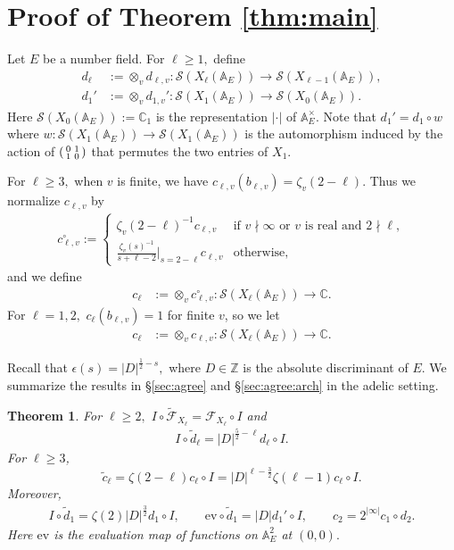 \documentclass[11pt,a4paper,reqno]{amsart}
\newtheorem{thm}{Theorem}[section]
\theoremstyle{remark}
\numberwithin{equation}{section}
\newcommand{\A}{\mathbb{A}}
\newcommand{\ZZ}{\mathbb{Z}}
\newcommand{\CC}{\mathbb{C}}
\theoremstyle{definition}
\numberwithin{equation}{section}
\newenvironment{psmatrix}
  {\left(\begin{smallmatrix}}
  {\end{smallmatrix}\right)}
\begin{document}
\section{Proof of Theorem \ref{thm:main}}\label{sec:mainproof}

Let $E$ be a number field. For $\ell\ge 1,$ define
\begin{align*}
    d_\ell&:=\otimes_{v} d_{\ell,v}:\mathcal{S}(X_\ell(\A_E))\longrightarrow \mathcal{S}(X_{\ell-1}(\A_E)),\\
    d_1'&:=\otimes_{v} d_{1,v}':\mathcal{S}(X_1(\A_E))\longrightarrow \mathcal{S}(X_{0}(\A_E)).
\end{align*}
Here $\mathcal{S}(X_0(\A_E)):=\CC_{1}$ is the representation $|\cdot|$ of $\A_E^\times.$ Note that $d_1'=d_1\circ w$
where $w:\mathcal{S}(X_1(\A_E))\longrightarrow\mathcal{S}(X_1(\A_E))$ is the automorphism induced by the action of $\begin{psmatrix}
    0 & 1\\
     1 & 0
\end{psmatrix}$ that permutes the two entries of $X_1$.


For $\ell\ge 3,$ when $v$ is finite, we have $c_{\ell,v}(b_{\ell,v})=\zeta_v(2-\ell).$ Thus we normalize $c_{\ell,v}$ by
\begin{align*}
    c_{\ell,v}^\circ:=\begin{cases}
        \zeta_v(2-\ell)^{-1}c_{\ell,v} & \textrm{if } v\nmid\infty \textrm{ or } v \textrm{ is real and } 2\nmid\ell,  \\
        \frac{\zeta_v(s)^{-1}}{s+\ell-2}\bigg|_{s=2-\ell} c_{\ell,v} & \textrm{otherwise,}
    \end{cases}
\end{align*}
and we define
\begin{align*}
     c_\ell&:=\otimes_{v} c_{\ell,v}^\circ:\mathcal{S}(X_\ell(\A_E))\longrightarrow \CC.
\end{align*}
For $\ell=1,2,$ $c_\ell(b_{\ell,v})=1$ for finite $v$, so we let
\begin{align*}
     c_\ell&:=\otimes_{v} c_{\ell,v}:\mathcal{S}(X_\ell(\A_E))\longrightarrow \CC.
\end{align*}

Recall that $\epsilon(s)=|D|^{\frac{1}{2}-s},$ where $D\in \ZZ$ is the absolute discriminant of $E$. We summarize the results in \S \ref{sec:agree} and \S \ref{sec:agree:arch} in the adelic setting.
\begin{thm}\label{thm:summary}
For $\ell\ge 2,$ $I\circ \widetilde{\mathcal{F}}_{X_\ell}=\mathcal{F}_{X_\ell}\circ I$ and
\begin{align*}
    I\circ \tilde{d}_{\ell}=|D|^{\frac{5}{2}-\ell}d_{\ell}\circ I.
\end{align*}
For $\ell\ge 3$, $$\tilde{c}_{\ell}=\zeta(2-\ell)c_\ell\circ I=|D|^{\ell-\frac{3}{2}}\zeta(\ell-1)c_\ell\circ I.$$ Moreover,
\begin{align*}
  I\circ \tilde{d}_{1}=\zeta(2)|D|^\frac{3}{2}d_{1}\circ I, \quad\quad \mathrm{ev}\circ \tilde{d}_1= |D|d_1'\circ I, \quad\quad  c_2=2^{|\infty|}c_1\circ d_2.
\end{align*}
Here $\mathrm{ev}$ is the evaluation map of functions on $\A_E^2$ at $(0,0).$
\end{thm}
\end{document}
